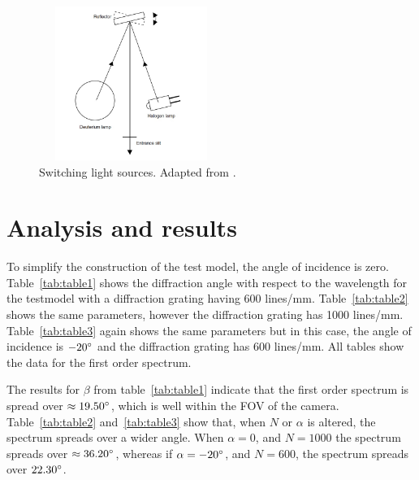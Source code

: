 \documentclass[aps,twocolumn,twoside,secnumarabic,balancelastpage,amsmath,amssymb,nofootinbib,hyperref=pdftex]{revtex4}
\begin{document}
\begin{figure}[htb]
\includegraphics[width=6cm, height=5cm]{sw-lssp.jpg}
\caption{Switching light sources. Adapted from \cite{lssp}.
\label{fig:sw-lssp}}
\end{figure}

\section{Analysis and results}
To simplify the construction of the test model, the angle of incidence is zero. Table~\ref{tab:table1} shows the diffraction angle with respect to the wavelength for the testmodel with a diffraction grating having 600 lines/mm. Table~\ref{tab:table2} shows the same parameters, however the diffraction grating has 1000 lines/mm. Table~\ref{tab:table3} again shows the same parameters but in this case, the angle of incidence is $-20\degree$ and the diffraction grating has 600 lines/mm. All tables show the data for the first order spectrum. 

The results for $\beta$ from table~\ref{tab:table1} indicate that the first order spectrum is spread over $\approx19.50\degree$, which is well within the FOV of the camera. Table~\ref{tab:table2} and~\ref{tab:table3} show that, when $N$ or $\alpha$ is altered, the spectrum spreads over a wider angle. When $\alpha=0$, and $N=1000$ the spectrum spreads over $\approx36.20\degree$, whereas if $\alpha=-20\degree$, and $N=600$, the spectrum spreads over $22.30\degree$.
\end{document}
